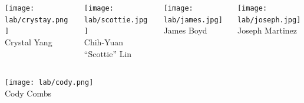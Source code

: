 \begin{frame}[c]{}
\begin{columns}[t]
\begin{column}[T]{3.5in}
\begin{columns}[t]
				
				
				
			\end{columns}
			
			\vspace{.1in}
			
			\begin{columns}[t]
			
				\begin{column}[T]{1in}
					{\centering
						\texttt{[image: lab/crystay.png]} \\
						\vspace{-.1in}
						{\tiny Crystal Yang} \\
						\par
					}
				\end{column}
			
				\begin{column}[T]{1in}
					{\centering
						\texttt{[image: lab/scottie.jpg]} \\
						\vspace{-.1in}
						{\tiny Chih-Yuan ``Scottie'' Lin} \\
						\par
					}
				\end{column}
			
				\begin{column}[T]{1in}
					{\centering
						\texttt{[image: lab/james.jpg]} \\
						\vspace{-.1in}
						{\tiny James Boyd} \\
						\par
					}
				\end{column}
			
				\begin{column}[T]{1in}
					{\centering
						\texttt{[image: lab/joseph.jpg]} \\
						\vspace{-.1in}
						{\tiny Joseph Martinez} \\
						\par
					}
				\end{column}
				
				
			\end{columns}
			
			\vspace{.1in}
			
			\begin{columns}[t]
				
				\begin{column}[T]{1in}
					{\centering
						\texttt{[image: lab/cody.png]} \\
						\vspace{-.1in}
						{\tiny Cody Combs} \\
						\par
					}
				\end{column}
			

\end{columns}
\end{column}
\end{columns}
\end{frame}
